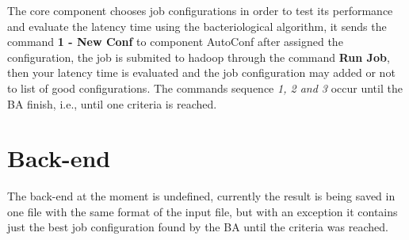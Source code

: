The core component chooses job configurations in order to test its performance
and evaluate the latency time using the bacteriological algorithm, it sends the
command {\bf 1 - New Conf} to component AutoConf after assigned the configuration,
the job is submited to hadoop through the command {\bf Run Job}, then your latency
time is evaluated and the job configuration may added or not to list of good
configurations. The commands sequence {\it 1, 2 and 3} occur until the BA finish,
i.e., until one criteria is reached.

\section{Back-end}

The back-end at the moment is undefined, currently the result is being saved in
one file with the same format of the input file, but with an exception it contains
just the best job configuration found by the BA until the criteria was reached.
